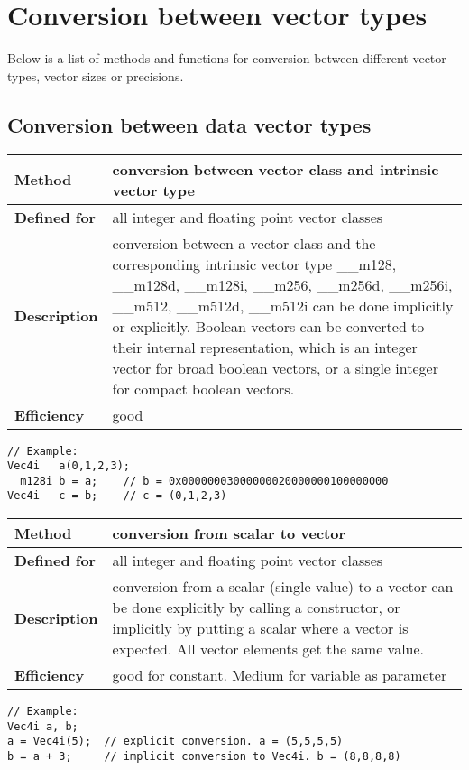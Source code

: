 \documentclass[vcl_manual.tex]{subfiles}
\begin{document}
\chapter{Conversion between vector types}\label{Conversion between vector types}
\flushleft

Below is a list of methods and functions for conversion between different vector types, vector sizes or precisions.

\section{Conversion between data vector types}

\begin{tabular}{|p{30mm}|p{120mm}|}
\hline
\bfseries Method & conversion between vector class and intrinsic vector type \\ \hline
\bfseries Defined for & all integer and floating point vector classes \\ \hline
\bfseries Description & conversion between a vector class and the corresponding intrinsic vector type \_\_m128, \_\_m128d, \_\_m128i, \_\_m256, \_\_m256d, \_\_m256i, \_\_m512, \_\_m512d, \_\_m512i can be done implicitly or explicitly. \newline
Boolean vectors can be converted to their internal representation, which is an integer vector for broad boolean vectors, or a single integer for compact boolean vectors. \\ \hline
\bfseries Efficiency & good \\ \hline
\end{tabular}
\begin{lstlisting}[frame=none]
// Example:
Vec4i   a(0,1,2,3);
__m128i b = a;    // b = 0x00000003000000020000000100000000
Vec4i   c = b;    // c = (0,1,2,3)
\end{lstlisting}


\begin{tabular}{|p{30mm}|p{120mm}|}
\hline
\bfseries Method & conversion from scalar to vector \\ \hline
\bfseries Defined for & all integer and floating point vector classes \\ \hline
\bfseries Description & conversion from a scalar (single value) to a vector can be done explicitly by calling a constructor, or implicitly by putting a scalar where a vector is expected. All vector elements get the same value. \\ \hline
\bfseries Efficiency & good for constant. Medium for variable as parameter \\ \hline
\end{tabular}
\begin{lstlisting}[frame=none]
// Example:
Vec4i a, b;
a = Vec4i(5);  // explicit conversion. a = (5,5,5,5)
b = a + 3;     // implicit conversion to Vec4i. b = (8,8,8,8)
\end{lstlisting}
\end{document}
